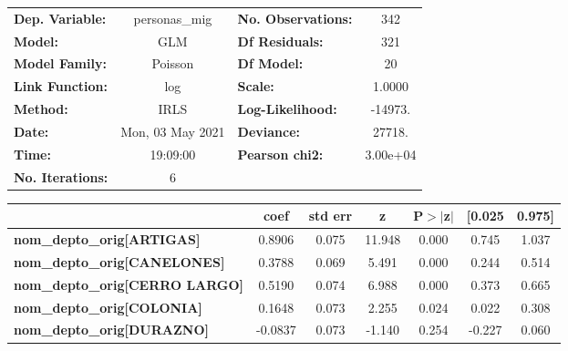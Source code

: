 \begin{center}
\begin{tabular}{lclc}
\toprule
\textbf{Dep. Variable:}                   &  personas\_mig   & \textbf{  No. Observations:  } &      342    \\
\textbf{Model:}                           &       GLM        & \textbf{  Df Residuals:      } &      321    \\
\textbf{Model Family:}                    &     Poisson      & \textbf{  Df Model:          } &       20    \\
\textbf{Link Function:}                   &       log        & \textbf{  Scale:             } &    1.0000   \\
\textbf{Method:}                          &       IRLS       & \textbf{  Log-Likelihood:    } &   -14973.   \\
\textbf{Date:}                            & Mon, 03 May 2021 & \textbf{  Deviance:          } &    27718.   \\
\textbf{Time:}                            &     19:09:00     & \textbf{  Pearson chi2:      } &  3.00e+04   \\
\textbf{No. Iterations:}                  &        6         & \textbf{                     } &             \\
\bottomrule
\end{tabular}
\begin{tabular}{lcccccc}
                                          & \textbf{coef} & \textbf{std err} & \textbf{z} & \textbf{P$> |$z$|$} & \textbf{[0.025} & \textbf{0.975]}  \\
\midrule
\textbf{nom\_depto\_orig[ARTIGAS]}        &       0.8906  &        0.075     &    11.948  &         0.000        &        0.745    &        1.037     \\
\textbf{nom\_depto\_orig[CANELONES]}      &       0.3788  &        0.069     &     5.491  &         0.000        &        0.244    &        0.514     \\
\textbf{nom\_depto\_orig[CERRO LARGO]}    &       0.5190  &        0.074     &     6.988  &         0.000        &        0.373    &        0.665     \\
\textbf{nom\_depto\_orig[COLONIA]}        &       0.1648  &        0.073     &     2.255  &         0.024        &        0.022    &        0.308     \\
\textbf{nom\_depto\_orig[DURAZNO]}        &      -0.0837  &        0.073     &    -1.140  &         0.254        &       -0.227    &        0.060     \\

\end{tabular}
\end{center}
